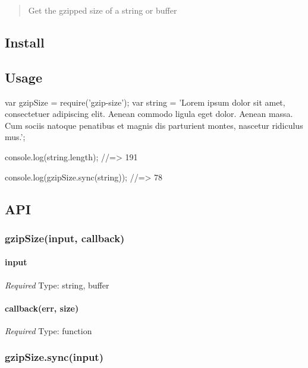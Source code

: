 \begin{quote}
Get the gzipped size of a string or buffer \end{quote}


\subsection*{Install}




\subsection*{Usage}


\begin{DoxyCode}
var gzipSize = require('gzip-size');
var string = 'Lorem ipsum dolor sit amet, consectetuer adipiscing elit. Aenean commodo ligula eget dolor.
       Aenean massa. Cum sociis natoque penatibus et magnis dis parturient montes, nascetur ridiculus mus.';

console.log(string.length);
//=> 191

console.log(gzipSize.sync(string));
//=> 78
\end{DoxyCode}


\subsection*{A\+PI}

\subsubsection*{gzip\+Size(input, callback)}

\paragraph*{input}

{\itshape Required} Type\+: {\ttfamily string}, {\ttfamily buffer}

\paragraph*{callback(err, size)}

{\itshape Required} Type\+: {\ttfamily function}

\subsubsection*{gzip\+Size.\+sync(input)}

